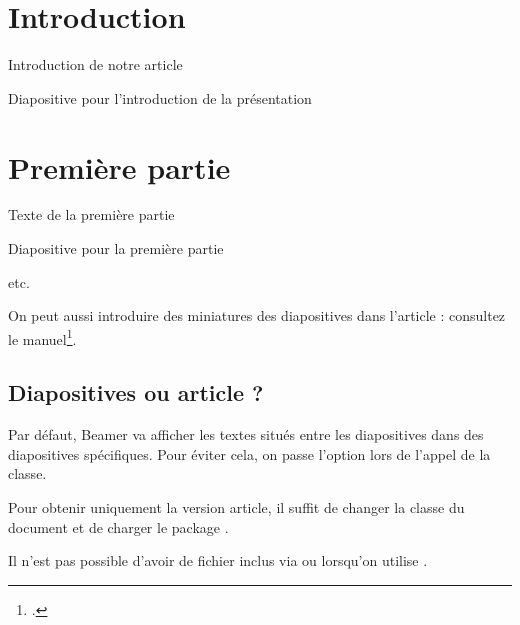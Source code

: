 \begin{latexcode}
\section{Introduction}

Introduction de notre article
\begin{frame}
    Diapositive pour l'introduction de la présentation
\end{frame}

\section{Première partie}

Texte de la première partie
\begin{frame}
    Diapositive pour la première partie
\end{frame}

etc.
\end{latexcode}

\begin{plusloins}
On peut aussi introduire des miniatures des diapositives  dans l'article : consultez le manuel\footcite{beamer_diapo_article}. 
\end{plusloins}

\subsection{Diapositives ou article ?}

Par défaut, Beamer va afficher les textes situés entre les diapositives dans des diapositives spécifiques. Pour éviter cela, on passe l'option  lors de l'appel de la classe.


Pour obtenir uniquement la version article, il suffit de changer la classe du document et de charger le package .



\begin{attention}
Il n'est pas possible d'avoir de fichier inclus via  ou  lorsqu'on utilise .
\end{attention}
